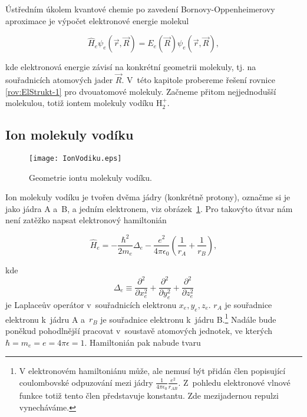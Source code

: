\newcommand{\orbital}[3]{#1 \mathrm{#2}_{#3}}

Ústředním úkolem kvantové chemie po zavedení Bornovy-Oppenheimerovy aproximace je výpočet elektronové energie molekul

\begin{equation}
\hat{H}_e \psi_e (\vec{r}, \vec{R}) = E_e (\vec{R}) \psi_e(\vec{r}, \vec{R}),
\label{rov:ElStrukt-1}
\end{equation}

\noindent kde elektronová energie závisí na konkrétní geometrii molekuly, tj. na souřadnicích atomových jader $\vec{R}$. V~této kapitole probereme řešení rovnice \eqref{rov:ElStrukt-1} pro dvouatomové molekuly. Začneme přitom nejjednodušší molekulou, totiž iontem molekuly vodíku H$_2^+$.   

\subsection{Ion molekuly vodíku}

\begin{figure} [htb]
\centering
\texttt{[image: IonVodiku.eps]}
\caption[Ion H$_2^{+}$]{Geometrie iontu molekuly vodíku.}
\label{obr:IonVodiku}
\end{figure}

Ion molekuly vodíku je tvořen dvěma jádry (konkrétně protony), označme si je jako jádra A a~B, a jedním elektronem, viz obrázek~\ref{obr:IonVodiku}. Pro takovýto útvar nám není zatěžko napsat elektronový hamiltonián

\begin{equation}
\hat{H}_e = -\frac{\hbar^2}{2 m_e} \Delta_e - \frac{e^2}{4 \pi \epsilon_0} \left( \frac{1}{r_A} + \frac{1}{r_B} \right),
\label{rov:ElStrukt-2}
\end{equation}


\noindent kde
\begin{equation}
\Delta_e \equiv \frac{\partial^2}{\partial x_e^2} + \frac{\partial^2}{\partial y_e^2} + \frac{\partial^2}{\partial z_e^2}
\nonumber
\end{equation}
je Laplaceův operátor v~souřadnicích elektronu $x_e, y_e, z_e$. $r_A$ je souřadnice elektronu k~jádru A a~$r_B$ je souřadnice elektronu k~jádru B.\footnote{V elektronovém hamiltoniánu může, ale nemusí být přidán člen popisující coulombovské odpuzování mezi jádry $\frac{1}{4 \pi \epsilon_0} \frac{e^2}{r_{AB}}$. Z~pohledu elektronové vlnové funkce totiž tento člen představuje konstantu. Zde mezijadernou repulzi vynecháváme.}  Nadále bude poněkud pohodlnější pracovat v~soustavě atomových jednotek, ve kterých $\hbar = m_e=e=4\pi \epsilon = 1$. Hamiltonián pak nabude tvaru

